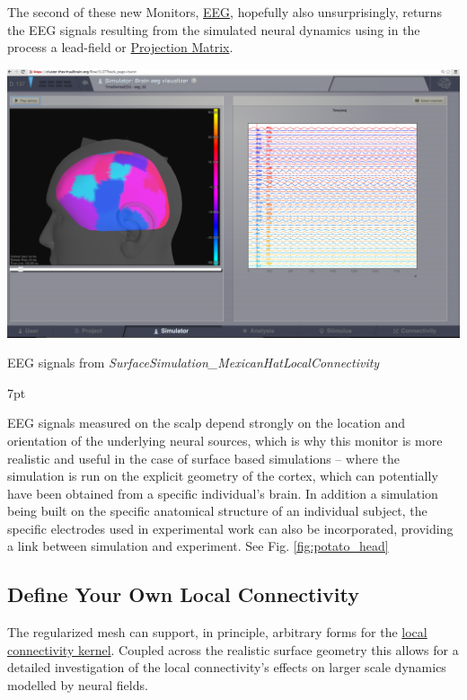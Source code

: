 \documentclass{tufte-handout}
\newenvironment{blah}{%
  \def\FrameCommand{%
    \hspace{1pt}%
    {\color{DarkOrange}\vrule width 2pt}%
    {\color{PeachPuff}\vrule width 4pt}%
    \colorbox{PeachPuff}%
  }%
  \MakeFramed{\advance\hsize-\width\FrameRestore}%
  \noindent\hspace{-4.55pt}%
  \begin{adjustwidth}{}{7pt}%
  \vspace{2pt}\vspace{2pt}%
}
{%
  \vspace{2pt}\end{adjustwidth}\endMakeFramed%
}
\begin{document}
The second of these new Monitors, \underline{EEG}, hopefully also
unsurprisingly, returns the EEG signals resulting from the simulated neural
dynamics using in the process a lead-field or \underline{Projection Matrix}.  


\begin{marginfigure}
  \includegraphics[width=\linewidth]{Handout_UI_BuildingYourOwnBrainNetworkModel_MexicanLocalConnectivityPotatoHead.png}%
  \caption{EEG signals from \textit{SurfaceSimulation\_MexicanHatLocalConnectivity}}%
  \label{fig:potato_head}%
\end{marginfigure}


\begin{blah}
EEG signals measured on the scalp depend strongly on the location
and orientation of the underlying neural sources, which is why this monitor is
more realistic and useful in the case of surface based simulations -- where
the simulation is run on the explicit geometry of the cortex, which can
potentially have been obtained from a specific individual's brain. 
In addition a simulation being built on the specific anatomical structure of an individual
subject, the specific electrodes used in experimental work can also be
incorporated, providing a link between simulation and
experiment. See Fig. \ref{fig:potato_head}
\end{blah}

\subsection{Define Your Own Local Connectivity}\label{sec:local_connectivity}

The regularized mesh can support, in principle, arbitrary forms for the
\underline{local connectivity kernel}. Coupled across the realistic surface geometry this
allows for a detailed investigation of the local connectivity's effects on
larger scale dynamics modelled by neural fields.
\end{document}
